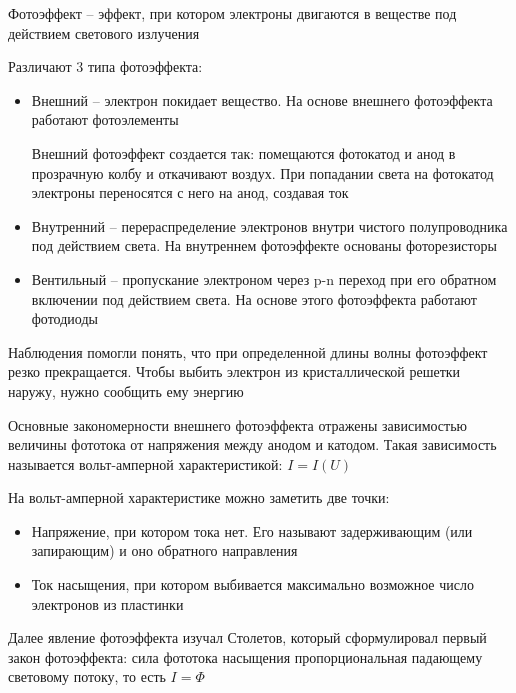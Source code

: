 \bigvspace

Фотоэффект -- эффект, при котором электроны двигаются в веществе под действием светового излучения

Различают 3 типа фотоэффекта:

\begin{itemize}
    \item Внешний -- электрон покидает вещество. На основе внешнего фотоэффекта работают фотоэлементы
    
    Внешний фотоэффект создается так: помещаются фотокатод и анод в прозрачную колбу и откачивают воздух. При попадании света на фотокатод электроны переносятся с него на анод, создавая ток 

    \item Внутренний -- перераспределение электронов внутри чистого полупроводника под действием света. На внутреннем фотоэффекте основаны фоторезисторы

    \item Вентильный -- пропускание электроном через p-n переход при его обратном включении под действием света. На основе этого фотоэффекта работают фотодиоды
\end{itemize}


Наблюдения помогли понять, что при определенной длины волны фотоэффект резко прекращается. Чтобы выбить электрон из кристаллической решетки наружу, нужно сообщить ему энергию

Основные закономерности внешнего фотоэффекта отражены зависимостью величины фототока от напряжения между анодом и катодом. Такая зависимость называется вольт-амперной характеристикой: $I = I(U)$


На вольт-амперной характеристике можно заметить две точки:

\begin{itemize}
    \item Напряжение, при котором тока нет. Его называют задерживающим (или запирающим) и оно обратного направления
    \item Ток насыщения, при котором выбивается максимально возможное число электронов из пластинки
\end{itemize}

\mediumvspace

Далее явление фотоэффекта изучал Столетов, который сформулировал первый закон фотоэффекта: сила фототока насыщения пропорциональная падающему световому потоку, то есть $I = \Phi$

